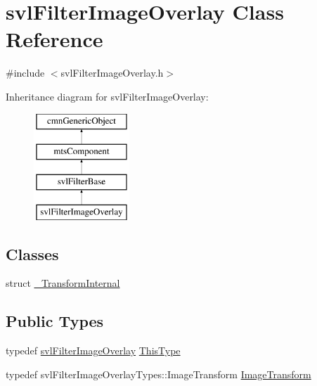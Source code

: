 \hypertarget{classsvl_filter_image_overlay}{}\section{svl\+Filter\+Image\+Overlay Class Reference}
\label{classsvl_filter_image_overlay}


{\ttfamily \#include $<$svl\+Filter\+Image\+Overlay.\+h$>$}

Inheritance diagram for svl\+Filter\+Image\+Overlay\+:\begin{figure}[H]
\begin{center}
\leavevmode
\includegraphics[height=4.000000cm]{dc/db5/classsvl_filter_image_overlay}
\end{center}
\end{figure}
\subsection*{Classes}
\begin{DoxyCompactItemize}
\item 
struct \hyperlink{structsvl_filter_image_overlay_1_1___transform_internal}{\+\_\+\+Transform\+Internal}
\end{DoxyCompactItemize}
\subsection*{Public Types}
\begin{DoxyCompactItemize}
\item 
typedef \hyperlink{classsvl_filter_image_overlay}{svl\+Filter\+Image\+Overlay} \hyperlink{classsvl_filter_image_overlay_a9e4175de9ad9d65a5621a9fd78da6227}{This\+Type}
\item 
typedef svl\+Filter\+Image\+Overlay\+Types\+::\+Image\+Transform \hyperlink{classsvl_filter_image_overlay_a68354a171b2498de3aa1c5ba0ff2f002}{Image\+Transform}
\end{DoxyCompactItemize}
